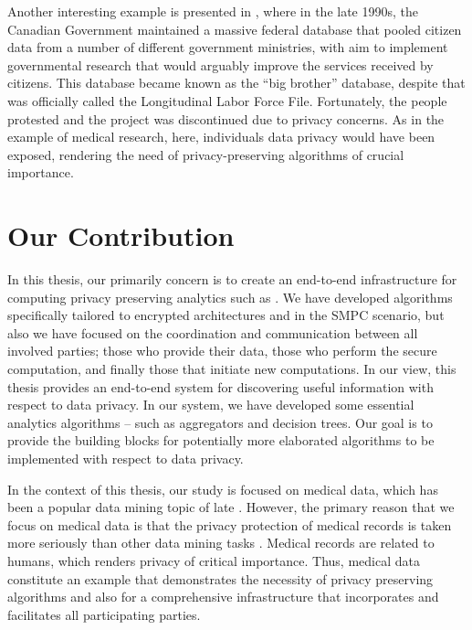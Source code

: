 Another interesting example is presented in \cite{lindell2000privacy}, where in the late 1990s, the Canadian Government maintained a massive federal database that pooled citizen data from a number of different government ministries, with aim to implement governmental research that would arguably improve the services received by citizens.
This database became known as the “big brother” database, despite that was officially called the Longitudinal Labor Force File.
Fortunately, the people protested and the project was discontinued due to privacy concerns.
As in the example of medical research, here, individuals data privacy would have been exposed, rendering the need of privacy-preserving algorithms of crucial importance.



\section{Our Contribution}\label{s:our-contribution}
In this thesis, our primarily concern is to create an end-to-end infrastructure for computing privacy preserving analytics such as \cite{lindell2000privacy, agrawal2000privacy}.
We have developed algorithms specifically tailored to encrypted architectures and in the SMPC scenario, but also we have focused on the coordination and communication between all involved parties; those who provide their data, those who perform the secure computation, and finally those that initiate new computations.
In our view, this thesis provides an end-to-end system for discovering useful information with respect to data privacy.
In our system, we have developed some essential analytics algorithms -- such as aggregators and decision trees.
Our goal is to provide the building blocks for potentially more elaborated algorithms to be implemented with respect to data privacy.


In the context of this thesis, our study is focused on medical data, which has been a popular data mining topic of late \cite{chaurasia2017data, erickson2017machine}.
However, the primary reason that we focus on medical data is that the privacy protection of medical records is taken more seriously than other data mining tasks \cite{bertino2005privacy}.
Medical records are related to humans, which renders privacy of critical importance.
Thus, medical data constitute an example that demonstrates the necessity of privacy preserving algorithms and also for a comprehensive infrastructure that incorporates and facilitates all participating parties.


